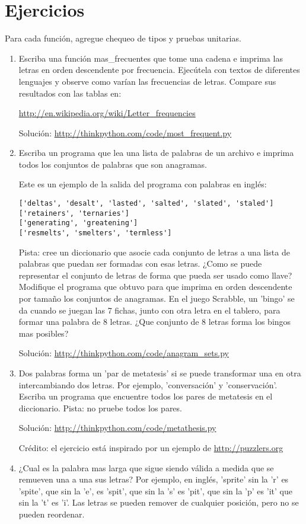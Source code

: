 \section{Ejercicios}

Para cada función, agregue chequeo de tipos y pruebas unitarias.
\begin{enumerate}
\item Escriba una función mas\_frecuentes que tome una cadena e imprima
las letras en orden descendente por frecuencia. Ejecútela con textos
de diferentes lenguajes y observe como varían las frecuencias de letras.
Compare sus resultados con las tablas en:

\url{http://en.wikipedia.org/wiki/Letter_frequencies}

Solución: \url{http://thinkpython.com/code/most_frequent.py}
\item Escriba un programa que lea una lista de palabras de un archivo e
imprima todos los conjuntos de palabras que son anagramas.

Este es un ejemplo de la salida del programa con palabras en inglés:
\begin{verbatim}
['deltas', 'desalt', 'lasted', 'salted', 'slated', 'staled'] 
['retainers', 'ternaries'] 
['generating', 'greatening']
['resmelts', 'smelters', 'termless']
\end{verbatim}
Pista: cree un diccionario que asocie cada conjunto de letras a una
lista de palabras que puedan ser formadas con esas letras. ¿Como se
puede representar el conjunto de letras de forma que pueda ser usado
como llave? Modifique el programa que obtuvo para que imprima en orden
descendente por tamaño los conjuntos de anagramas. En el juego Scrabble,
un 'bingo' se da cuando se juegan las 7 fichas, junto con otra letra
en el tablero, para formar una palabra de 8 letras. ¿Que conjunto
de 8 letras forma los bingos mas posibles?

Solución: \url{http://thinkpython.com/code/anagram_sets.py}
\item Dos palabras forma un 'par de metatesis' si se puede transformar una
en otra intercambiando dos letras. Por ejemplo, 'conversación' y 'conservación'.
Escriba un programa que encuentre todos los pares de metatesis en
el diccionario. Pista: no pruebe todos los pares.

Solución: \url{http://thinkpython.com/code/metathesis.py}

Crédito: el ejercicio está inspirado por un ejemplo de \url{http://puzzlers.org}
\item ¿Cual es la palabra mas larga que sigue siendo válida a medida que
se remueven una a una sus letras? Por ejemplo, en inglés, 'sprite'
sin la 'r' es 'spite', que sin la 'e', es 'spit', que sin la 's' es
'pit', que sin la 'p' es 'it' que sin la 't' es 'i'. Las letras se
pueden remover de cualquier posición, pero no se pueden reordenar.


\end{enumerate}
